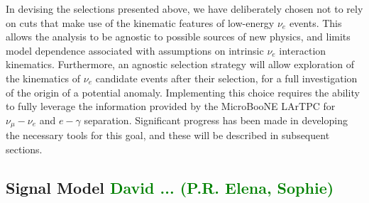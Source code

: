 \par %
In devising the selections presented above, we have deliberately chosen not to rely on cuts that make use of the kinematic features of low-energy $\nu_e$ events. This allows the analysis to be agnostic to possible sources of new physics, and limits model dependence associated with assumptions on intrinsic $\nu_e$ interaction kinematics. Furthermore, an agnostic selection strategy will allow exploration of the kinematics of $\nu_e$ candidate events after their selection, for a full investigation of the origin of a potential anomaly. Implementing this choice requires the ability to fully leverage the information provided by the MicroBooNE LArTPC for $\nu_{\mu}-\nu_e$ and $e-\gamma$ separation. Significant progress has been made in developing the necessary tools for this goal, and these will be described in subsequent sections. 




\subsection{Signal Model \textcolor{green}{David  ... (P.R. Elena, Sophie) }}

